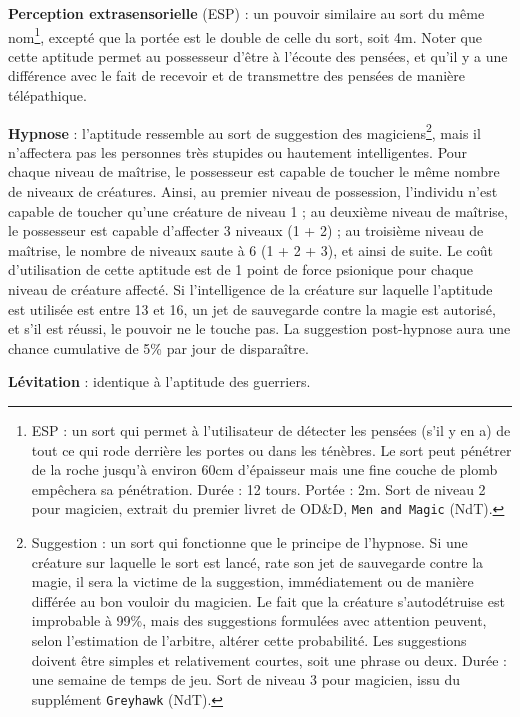 \documentclass[11pt]{article}
\begin{document}
{\bigskip

\textbf{Perception extrasensorielle} (ESP) : un pouvoir similaire au sort du même nom\footnote{
\og ESP : un sort qui permet à l'utilisateur de détecter les pensées (s'il y en a) de tout ce qui rode derrière les portes ou dans les ténèbres. Le sort peut pénétrer de la roche jusqu'à environ 60cm d'épaisseur mais une fine couche de plomb empêchera sa pénétration. Durée : 12 tours. Portée : 2m. \fg{} Sort de niveau 2 pour magicien, extrait du premier livret de OD\&D, \texttt{Men and Magic} (NdT).
}, excepté que la portée est le double de celle du sort, soit 4m. Noter que cette aptitude permet au possesseur d'être \og à l'écoute \fg{} des pensées, et qu'il y a une différence avec le fait de recevoir et de transmettre des pensées de manière télépathique.

\bigskip

\textbf{Hypnose} : l'aptitude ressemble au sort de suggestion des magiciens\footnote{
\og Suggestion : un sort qui fonctionne que le principe de l'hypnose. Si une créature sur laquelle le sort est lancé, rate son jet de sauvegarde contre la magie, il sera la victime de la suggestion, immédiatement ou de manière différée au bon vouloir du magicien. Le fait que la créature s'autodétruise est improbable à 99\%, mais des suggestions formulées avec attention peuvent, selon l'estimation de l'arbitre, altérer cette probabilité. Les suggestions doivent être simples et relativement courtes, soit une phrase ou deux. Durée : une semaine de temps de jeu.\fg{} Sort de niveau 3 pour magicien, issu du supplément \texttt{Greyhawk} (NdT).
}, mais il n'affectera pas les personnes très stupides ou hautement intelligentes. Pour chaque niveau de maîtrise, le possesseur est capable de toucher le même nombre de niveaux de créatures. Ainsi, au premier niveau de possession, l'individu n'est capable de toucher qu'une créature de niveau 1 ; au deuxième niveau de maîtrise, le possesseur est capable d'affecter 3 niveaux (1 + 2) ; au troisième niveau de maîtrise, le nombre de niveaux saute à 6 (1 + 2 + 3), et ainsi de suite. Le coût d'utilisation de cette aptitude est de 1 point de force psionique pour chaque niveau de créature affecté. Si l'intelligence de la créature sur laquelle l'aptitude est utilisée est entre 13 et 16, un jet de sauvegarde contre la magie est autorisé, et s'il est réussi, le pouvoir ne le touche pas. La suggestion post-hypnose aura  une chance cumulative de 5\% par jour de disparaître.

\bigskip

\textbf{Lévitation} : identique à l'aptitude des guerriers.

}
\end{document}
